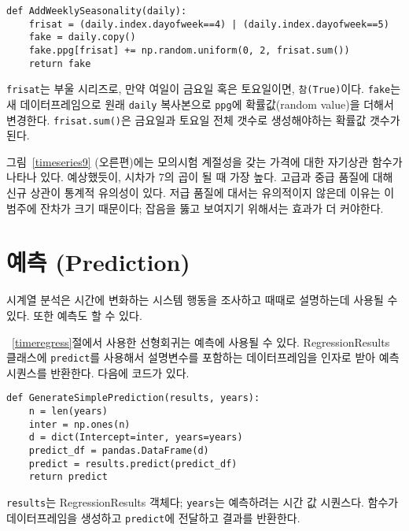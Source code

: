 \begin{verbatim}
def AddWeeklySeasonality(daily):
    frisat = (daily.index.dayofweek==4) | (daily.index.dayofweek==5)
    fake = daily.copy()
    fake.ppg[frisat] += np.random.uniform(0, 2, frisat.sum())
    return fake
\end{verbatim}

{\tt frisat}는 부울 시리즈로, 만약 여일이 금요일 혹은 토요일이면, {\tt 참(True)}이다. {\tt fake}는 새 데이터프레임으로 원래 {\tt daily} 복사본으로 {\tt ppg}에 확률값(random value)을 더해서 변경한다. {\tt frisat.sum()}은 금요일과 토요일 전체 갯수로 생성해야하는 확률값 갯수가 된다.


그림~\ref{timeseries9} (오른편)에는 모의시험 계절성을 갖는 가격에 대한 자기상관 함수가 나타나 있다. 예상했듯이, 시차가 7의 곱이 될 때 가장 높다. 고급과 중급 품질에 대해 신규 상관이 통계적 유의성이 있다. 저급 품질에 대서는 유의적이지 않은데 이유는 이 범주에 잔차가 크기 때문이다; 잡음을 뚫고 보여지기 위해서는 효과가 더 커야한다.
 


\section{예측 (Prediction)}  

시계열 분석은 시간에 변화하는 시스템 행동을 조사하고 때때로 설명하는데 사용될 수 있다. 또한 예측도 할 수 있다.

~\ref{timeregress}절에서 사용한 선형회귀는 예측에 사용될 수 있다.
RegressionResults 클래스에 {\tt predict}를 사용해서
설명변수를 포함하는 데이터프레임을 인자로 받아 예측 시퀀스를 반환한다.
다음에 코드가 있다.

\begin{verbatim}
def GenerateSimplePrediction(results, years):
    n = len(years)
    inter = np.ones(n)
    d = dict(Intercept=inter, years=years)
    predict_df = pandas.DataFrame(d)
    predict = results.predict(predict_df)
    return predict
\end{verbatim}

{\tt results}는 RegressionResults 객체다; 
{\tt years}는 예측하려는 시간 값 시퀀스다.
함수가 데이터프레임을 생성하고 {\tt predict}에 전달하고 결과를 반환한다.

